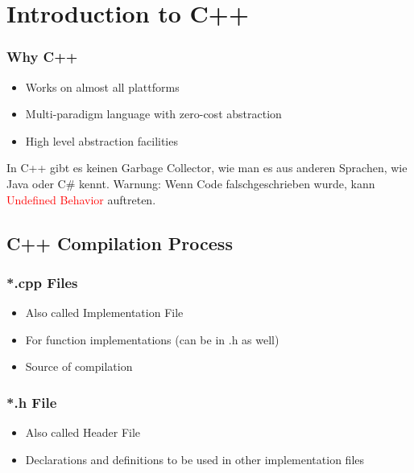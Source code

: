 
\section{Introduction to C++}

\subsubsection{Why C++}
\begin{itemize}
    \item Works on almost all plattforms
    \item Multi-paradigm language with zero-cost abstraction
    \item High level abstraction facilities
\end{itemize}
\vspace{1em}

In C++ gibt es keinen Garbage Collector, wie man es aus anderen Sprachen, wie Java oder C\# kennt. Warnung: Wenn Code \dq falsch\dq geschrieben wurde, kann \textcolor{red}{Undefined Behavior} auftreten.

\subsection{C++ Compilation Process}
\subsubsection{*.cpp Files}
\begin{itemize}
    \item Also called Implementation File
    \item For function implementations (can be in .h as well)
    \item Source of compilation
\end{itemize}
\subsubsection{*.h File}
\begin{itemize}
    \item Also called Header File
    \item Declarations and definitions to be used in other implementation files
\end{itemize}

